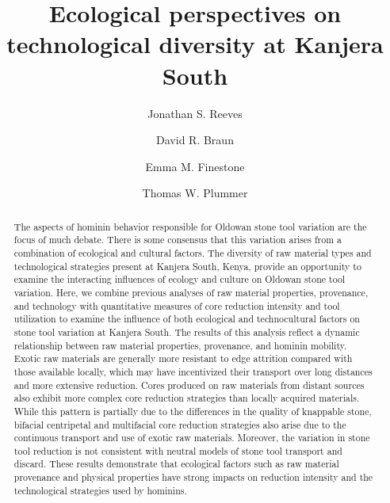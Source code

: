 \documentclass[]{elsarticle} %
\begin{document}
\begin{frontmatter}

  \title{Ecological perspectives on technological diversity at Kanjera
South}
    \author[Max Planck Institute For Evolutionary Anthropology]{Jonathan
S. Reeves}
    \author[The George Washington University]{David R. Braun}
  
    \author[Max Plank Institute For the Science of Human History]{Emma
M. Finestone}
  
    \author[Queens College City University of New York]{Thomas W.
Plummer}
  
      \address[MPI]{Technological Primates Research Group, Max Planck
Institute For Evolutionary Anthropology, Deutscher Platz 6, Leipzig,
04103, Germany}
    \address[CASHP]{Center for the Advanced Study of Human Paleobiology,
George Washington University, 800 22nd Street, North West, Washington,
D.C., USA}
    \address[SHH]{Department of Archaeology, Max Planck Institute for
the Science of Human History, Kahlaische Strasse 10, Jena, D-07743,
Germany}
    \address[NYCEP]{Dept of Anthropology, Queens College, City
University of New York, Flushing, NY, 11367-1597, USA}
    
  \begin{abstract}
  The aspects of hominin behavior responsible for Oldowan stone tool
  variation are the focus of much debate. There is some consensus that
  this variation arises from a combination of ecological and cultural
  factors. The diversity of raw material types and technological
  strategies present at Kanjera South, Kenya, provide an opportunity to
  examine the interacting influences of ecology and culture on Oldowan
  stone tool variation. Here, we combine previous analyses of raw
  material properties, provenance, and technology with quantitative
  measures of core reduction intensity and tool utilization to examine
  the influence of both ecological and technocultural factors on stone
  tool variation at Kanjera South. The results of this analysis reflect
  a dynamic relationship between raw material properties, provenance,
  and hominin mobility. Exotic raw materials are generally more
  resistant to edge attrition compared with those available locally,
  which may have incentivized their transport over long distances and
  more extensive reduction. Cores produced on raw materials from distant
  sources also exhibit more complex core reduction strategies than
  locally acquired materials. While this pattern is partially due to the
  differences in the quality of knappable stone, bifacial centripetal
  and multifacial core reduction strategies also arise due to the
  continuous transport and use of exotic raw materials. Moreover, the
  variation in stone tool reduction is not consistent with neutral
  models of stone tool transport and discard. These results demonstrate
  that ecological factors such as raw material provenance and physical
  properties have strong impacts on reduction intensity and the
  technological strategies used by hominins.
  \end{abstract}
  
 \end{frontmatter}
\end{document}
